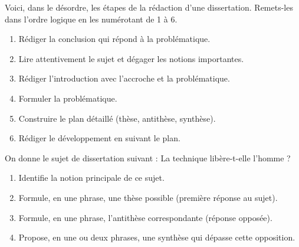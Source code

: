 \documentclass[11pt]{article}
\begin{document}
\begin{exercice}
Voici, dans le désordre, les étapes de la rédaction d'une dissertation. Remets-les dans l'ordre logique en les numérotant de 1 à 6.
\begin{enumerate}
\item[$\square$] Rédiger la conclusion qui répond à la problématique.
\item[$\square$] Lire attentivement le sujet et dégager les notions importantes.
\item[$\square$] Rédiger l'introduction avec l'accroche et la problématique.
\item[$\square$] Formuler la problématique.
\item[$\square$] Construire le plan détaillé (thèse, antithèse, synthèse).
\item[$\square$] Rédiger le développement en suivant le plan.
\end{enumerate}
\end{exercice}

\begin{exercice}
On donne le sujet de dissertation suivant : \og La technique libère-t-elle l'homme ? \fg
\begin{enumerate}
\item Identifie la notion principale de ce sujet.
\item Formule, en une phrase, une thèse possible (première réponse au sujet).
\item Formule, en une phrase, l'antithèse correspondante (réponse opposée).
\item Propose, en une ou deux phrases, une synthèse qui dépasse cette opposition.
\end{enumerate}
\end{exercice}
\end{document}
